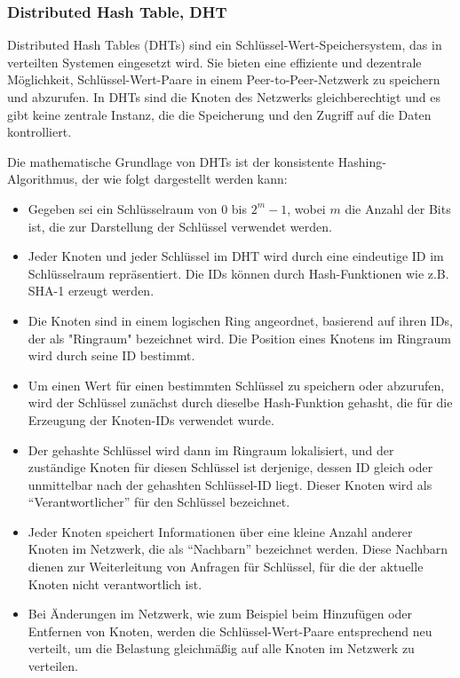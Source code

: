 \subsubsection{Distributed Hash Table, DHT}

Distributed Hash Tables (DHTs) sind ein Schlüssel-Wert-Speichersystem, das in verteilten Systemen eingesetzt wird. Sie bieten eine effiziente und dezentrale Möglichkeit, Schlüssel-Wert-Paare in einem Peer-to-Peer-Netzwerk zu speichern und abzurufen. In DHTs sind die Knoten des Netzwerks gleichberechtigt und es gibt keine zentrale Instanz, die die Speicherung und den Zugriff auf die Daten kontrolliert.

Die mathematische Grundlage von DHTs ist der konsistente Hashing-Algorithmus, der wie folgt dargestellt werden kann:

\begin{itemize}
\item Gegeben sei ein Schlüsselraum von $0$ bis $2^m - 1$, wobei $m$ die Anzahl der Bits ist, die zur Darstellung der Schlüssel verwendet werden.
\item Jeder Knoten und jeder Schlüssel im DHT wird durch eine eindeutige ID im Schlüsselraum repräsentiert. Die IDs können durch Hash-Funktionen wie z.B. SHA-1 erzeugt werden.
\item Die Knoten sind in einem logischen Ring angeordnet, basierend auf ihren IDs, der als "Ringraum" bezeichnet wird. Die Position eines Knotens im Ringraum wird durch seine ID bestimmt.
\item Um einen Wert für einen bestimmten Schlüssel zu speichern oder abzurufen, wird der Schlüssel zunächst durch dieselbe Hash-Funktion gehasht, die für die Erzeugung der Knoten-IDs verwendet wurde.
\item Der gehashte Schlüssel wird dann im Ringraum lokalisiert, und der zuständige Knoten für diesen Schlüssel ist derjenige, dessen ID gleich oder unmittelbar nach der gehashten Schlüssel-ID liegt. Dieser Knoten wird als \enquote{Verantwortlicher} für den Schlüssel bezeichnet.
\item Jeder Knoten speichert Informationen über eine kleine Anzahl anderer Knoten im Netzwerk, die als \enquote{Nachbarn} bezeichnet werden. Diese Nachbarn dienen zur Weiterleitung von Anfragen für Schlüssel, für die der aktuelle Knoten nicht verantwortlich ist.
\item Bei Änderungen im Netzwerk, wie zum Beispiel beim Hinzufügen oder Entfernen von Knoten, werden die Schlüssel-Wert-Paare entsprechend neu verteilt, um die Belastung gleichmäßig auf alle Knoten im Netzwerk zu verteilen.
\end{itemize}
